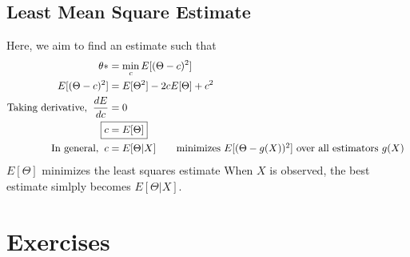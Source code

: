 \documentclass[11pt, a4paper]{article}
\begin{document}
    \subsection{Least Mean Square Estimate}
    Here, we aim to find an estimate such that
    \begin{align*}
        \theta* &= \min_{c} E[(\Theta - c)^{2}]\\
        E[(\Theta - c)^{2}] &= E[\Theta^{2}] - 2cE[\Theta] + c^{2}\\
        \text{Taking derivative,\;\;} \frac{dE}{dc} &= 0\\
        \Aboxed{c &= E[\Theta]}\\
        \text{In general,\;\;} c &= E[\Theta|X] \tag*{minimizes $E[(\Theta - g(X))^{2}]$ over all estimators $g(X)$ }
    \end{align*}
    $E[\Theta]$ minimizes the least squares estimate
    \newline
    When $X$ is observed, the best estimate simlply becomes $E[\Theta|X]$.


    \section{Exercises}
\end{document}
